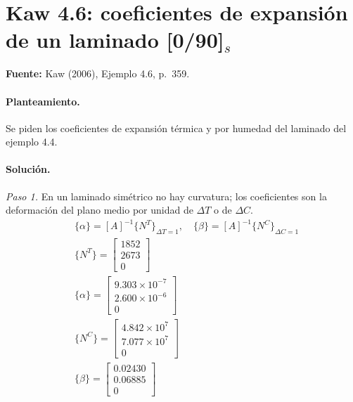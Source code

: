 \documentclass[11pt]{article}
\begin{document}
\clearpage
\section{Kaw 4.6: coeficientes de expansión de un laminado [0/90]$_s$}\label{ej:kaw_4_6}
\textbf{Fuente:} Kaw (2006), Ejemplo 4.6, p.~359.

\paragraph{Planteamiento.} Se piden los coeficientes de expansión térmica y por humedad del laminado del ejemplo 4.4.

\paragraph{Solución.}
\textit{Paso 1.} En un laminado simétrico no hay curvatura; los coeficientes son la deformación del plano medio por unidad de $\Delta T$ o de $\Delta C$.
\begin{align*}
&\{\alpha\}=[A]^{-1}\{N^T\}_{\Delta T=1},\quad \{\beta\}=[A]^{-1}\{N^C\}_{\Delta C=1} \\
&\{N^T\}=\begin{bmatrix}1852 \\ 2673 \\ 0\end{bmatrix} \\
&\{\alpha\}=\begin{bmatrix}9.303\times10^{-7} \\ 2.600\times10^{-6} \\ 0\end{bmatrix} \\
&\{N^C\}=\begin{bmatrix}4.842\times10^{7} \\ 7.077\times10^{7} \\ 0\end{bmatrix} \\
&\{\beta\}=\begin{bmatrix}0.02430 \\ 0.06885 \\ 0\end{bmatrix}
\end{align*}
\end{document}
